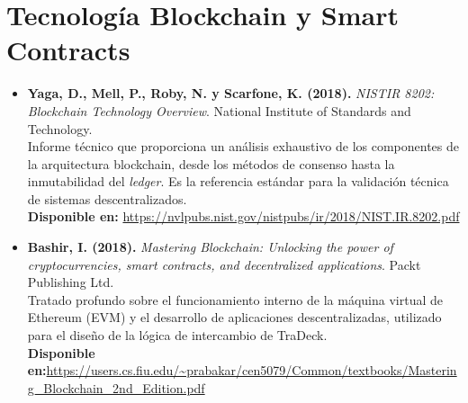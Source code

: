 \section{Tecnología Blockchain y Smart Contracts}
\begin{itemize}
	\raggedright
	\item \textbf{Yaga, D., Mell, P., Roby, N. y Scarfone, K. (2018).} \textit{NISTIR 8202: Blockchain Technology Overview}. National Institute of Standards and Technology. \medskip \\
	Informe técnico que proporciona un análisis exhaustivo de los componentes de la arquitectura blockchain, desde los métodos de consenso hasta la inmutabilidad del \textit{ledger}. Es la referencia estándar para la validación técnica de sistemas descentralizados. \medskip \\
	\textbf{Disponible en:} \url{https://nvlpubs.nist.gov/nistpubs/ir/2018/NIST.IR.8202.pdf}
	
	\item \textbf{Bashir, I. (2018).} \textit{Mastering Blockchain: Unlocking the power of cryptocurrencies, smart contracts, and decentralized applications}. Packt Publishing Ltd. \medskip \\
	Tratado profundo sobre el funcionamiento interno de la máquina virtual de Ethereum (EVM) y el desarrollo de aplicaciones descentralizadas, utilizado para el diseño de la lógica de intercambio de TraDeck. \medskip \\
	\textbf{Disponible en:}\url{https://users.cs.fiu.edu/~prabakar/cen5079/Common/textbooks/Mastering_Blockchain_2nd_Edition.pdf}
\end{itemize}